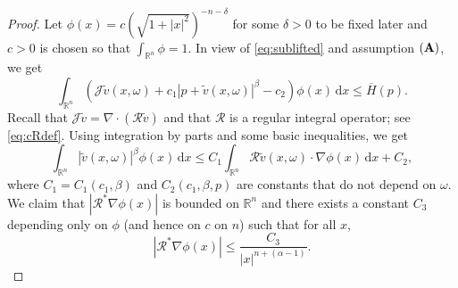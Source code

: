 \documentclass[10pt,a4paper]{amsart}
\newcommand{\R}{{\mathbb{R}}}
\begin{document}
\begin{proof} Let $\phi(x) = c(\sqrt{1+|x|^2})^{-n-\delta}$ for some $\delta>0$ to be fixed later and $c>0$ is chosen so that $\int_{\R^n} \phi =1$. In view of \eqref{eq:sublifted} and assumption $(\bf{A})$, we get
\begin{equation}
    \int_{\mathbb{R}^n}(\mathscr{J}\widetilde v (x,\omega) + c_{1}|p + \widetilde v(x,\omega)|^{\beta} - c_{2})\phi(x)\,\mathrm{d}x \leq \overline{H}(p).
\end{equation}
Recall that $\mathscr{J}\widetilde v=\nabla \cdot (\mathcal{R}\widetilde v)$ and that $\mathcal{R}$ is a regular integral operator; see \eqref{eq:cRdef}. Using integration by parts and some basic inequalities, we get
\begin{equation}\label{vLpE}
    \int_{\mathbb{R}^n} |\widetilde v(x,\omega)|^{\beta}\phi(x)\,\mathrm{d}x  
    \leq C_{1} \int_{\mathbb{R}^n}  \mathcal{R} \widetilde v (x,\omega)\cdot \nabla \phi(x)\,\mathrm{d}x + C_{2},
\end{equation}
where $C_1 = C_1(c_1,\beta)$ and $C_2(c_1,\beta,p)$ are constants that do not depend on $\omega$. We claim that $|\mathcal{R}^*\nabla \phi(x)|$ is bounded on $\R^n$ and there exists a constant $C_3$ depending only on $\phi$ (and hence on $c$ on $n$) such that for all $x$, 
\begin{equation}
\label{eq:bddR*phi}
    \left|\mathcal{R}^* \nabla \phi(x)\right| \le \frac{C_3}{|x|^{n+(\alpha-1)}}.%
\end{equation}


\end{proof}
\end{document}
